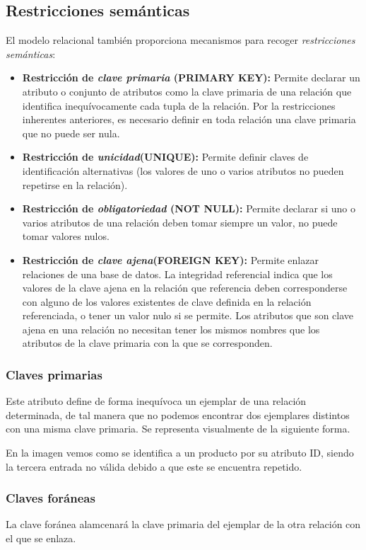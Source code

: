 \subsection{Restricciones semánticas}
El modelo relacional también proporciona mecanismos para recoger \emph{restricciones semánticas}:
\begin{itemize}
    \item \textbf{Restricción de \textit{clave primaria} (PRIMARY KEY): }Permite declarar un atributo o conjunto de atributos como la clave primaria de una relación que identifica inequívocamente cada tupla de la relación. Por la restricciones inherentes anteriores, es necesario definir en toda relación una clave primaria que no puede ser nula.
    \item \textbf{Restricción de \textit{unicidad}(UNIQUE): }Permite definir claves de identificación alternativas (los valores de uno o varios atributos no pueden repetirse en la relación).
    \item \textbf{Restricción de \textit{obligatoriedad} (NOT NULL): }Permite declarar si uno o varios atributos de una relación deben tomar siempre un valor, no puede tomar valores nulos.
    \item \textbf{Restricción de \textit{clave ajena}(FOREIGN KEY): }Permite enlazar relaciones de una base de datos. La integridad referencial indica que los valores de la clave ajena en la relación que referencia deben corresponderse con alguno de los valores existentes de clave definida en la relación referenciada, o tener un valor nulo si se permite. Los atributos que son clave ajena en una relación no necesitan tener los mismos nombres que los atributos de la clave primaria con la que se corresponden.
\end{itemize}

\subsubsection{Claves primarias}
Este atributo define de forma inequívoca un ejemplar de una relación determinada, de tal manera que no podemos encontrar dos ejemplares distintos con una misma clave primaria. Se representa visualmente de la siguiente forma.

En la imagen vemos como se identifica a un producto por su atributo ID, siendo la tercera entrada no válida debido a que este se encuentra repetido.

\subsubsection{Claves foráneas}
La clave foránea alamcenará la clave primaria del ejemplar de la otra relación con el que se enlaza.

